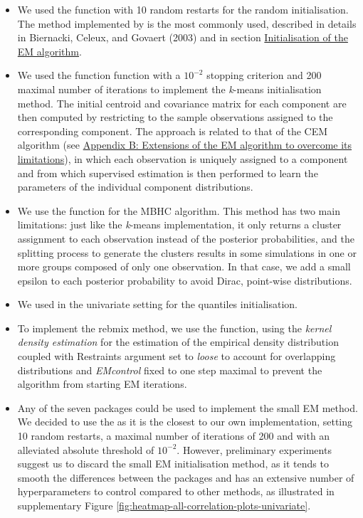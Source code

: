 \begin{itemize}
\item
  We used the function  with 10 random restarts for the random initialisation. The method implemented by  is the most commonly used, described in details in Biernacki, Celeux, and Govaert (2003) and in section \protect\hyperlink{initialisation-of-the-em-algorithm}{Initialisation of the EM algorithm}.
\item
  We used the function  function with a \(10^{-2}\) stopping criterion and 200 maximal number of iterations to implement the \emph{k}-means initialisation method.
  The initial centroid and covariance matrix for each component are then computed by restricting to the sample observations assigned to the corresponding component. The approach is related to that of the CEM algorithm (see \protect\hyperlink{appendix-b-extensions-of-the-em-algorithm-to-overcome-its-limitations}{Appendix B: Extensions of the EM algorithm to overcome its limitations}), in which each observation is uniquely assigned to a component and from which supervised estimation is then performed to learn the parameters of the individual component distributions.
\item
  We use the  function for the MBHC algorithm. This method has two main limitations: just like the \emph{k}-means implementation, it only returns a cluster assignment to each observation instead of the posterior probabilities, and the splitting process to generate the clusters results in some simulations in one or more groups composed of only one observation. In that case, we add a small epsilon to each posterior probability to avoid Dirac, point-wise distributions.
\item
  We used in the univariate setting  for the quantiles initialisation.
\item
  To implement the rebmix method, we use the  function, using the \emph{kernel density estimation} for the estimation of the empirical density distribution coupled with Restraints argument set to \emph{loose} to account for overlapping distributions and \emph{EMcontrol} fixed to one step maximal to prevent the algorithm from starting EM iterations.
\item
  Any of the seven packages could be used to implement the small EM method. We decided to use the  as it is the closest to our own implementation, setting 10 random restarts, a maximal number of iterations of 200 and with an alleviated absolute threshold of \(10^{-2}\). However, preliminary experiments suggest us to discard the small EM
  initialisation method, as it tends to smooth the differences between the packages and has an extensive number of hyperparameters to control compared to other methods, as illustrated in supplementary Figure \ref{fig:heatmap-all-correlation-plots-univariate}.
\end{itemize}

